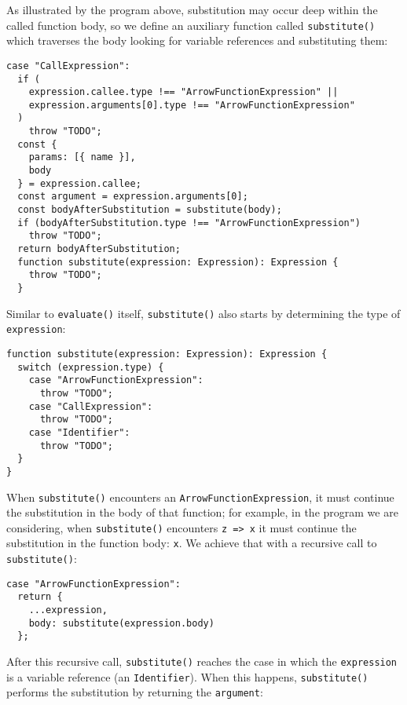 \documentclass[12pt, oneside]{book}
\begin{document}
As illustrated by the program above, substitution may occur deep within the called function body, so we define an auxiliary function called \texttt{substitute()} which traverses the body looking for variable references and substituting them:

\begin{verbatim}
case "CallExpression":
  if (
    expression.callee.type !== "ArrowFunctionExpression" ||
    expression.arguments[0].type !== "ArrowFunctionExpression"
  )
    throw "TODO";
  const {
    params: [{ name }],
    body
  } = expression.callee;
  const argument = expression.arguments[0];
  const bodyAfterSubstitution = substitute(body);
  if (bodyAfterSubstitution.type !== "ArrowFunctionExpression")
    throw "TODO";
  return bodyAfterSubstitution;
  function substitute(expression: Expression): Expression {
    throw "TODO";
  }
\end{verbatim}

Similar to \texttt{evaluate()} itself, \texttt{substitute()} also starts by determining the type of \texttt{expression}:

\begin{verbatim}
function substitute(expression: Expression): Expression {
  switch (expression.type) {
    case "ArrowFunctionExpression":
      throw "TODO";
    case "CallExpression":
      throw "TODO";
    case "Identifier":
      throw "TODO";
  }
}
\end{verbatim}

When \texttt{substitute()} encounters an \texttt{ArrowFunctionExpression}, it must continue the substitution in the body of that function; for example, in the program we are considering, when \texttt{substitute()} encounters \texttt{z => x} it must continue the substitution in the function body: \texttt{x}. We achieve that with a recursive call to \texttt{substitute()}:

\begin{verbatim}
case "ArrowFunctionExpression":
  return {
    ...expression,
    body: substitute(expression.body)
  };
\end{verbatim}

After this recursive call, \texttt{substitute()} reaches the case in which the \texttt{expression} is a variable reference (an \texttt{Identifier}). When this happens, \texttt{substitute()} performs the substitution by returning the \texttt{argument}:
\end{document}
